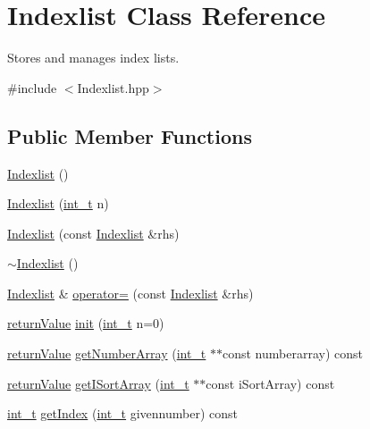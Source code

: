 \hypertarget{class_indexlist}{}\section{Indexlist Class Reference}
\label{class_indexlist}


Stores and manages index lists.  




{\ttfamily \#include $<$Indexlist.\+hpp$>$}

\subsection*{Public Member Functions}
\begin{DoxyCompactItemize}
\item 
\hyperlink{class_indexlist_ae8912418954f7d3988b45e61ae3e1792}{Indexlist} ()
\item 
\hyperlink{class_indexlist_aa8c9a7435650a1f0d6690fa14ff033dc}{Indexlist} (\hyperlink{_types_8hpp_ab6fd6105e64ed14a0c9281326f05e623}{int\+\_\+t} n)
\item 
\hyperlink{class_indexlist_ad9e5f23de8e6689e64bb47fa94d54af3}{Indexlist} (const \hyperlink{class_indexlist}{Indexlist} \&rhs)
\item 
\hyperlink{class_indexlist_a25da3346974b3749f54355fc040c6450}{$\sim$\+Indexlist} ()
\item 
\hyperlink{class_indexlist}{Indexlist} \& \hyperlink{class_indexlist_a3f2085c6aed278494e5314691d155a93}{operator=} (const \hyperlink{class_indexlist}{Indexlist} \&rhs)
\item 
\hyperlink{_message_handling_8hpp_a81d556f613bfbabd0b1f9488c0fa865e}{return\+Value} \hyperlink{class_indexlist_ab835188e0e58ae5fd081fbb16a9f859c}{init} (\hyperlink{_types_8hpp_ab6fd6105e64ed14a0c9281326f05e623}{int\+\_\+t} n=0)
\item 
\hyperlink{_message_handling_8hpp_a81d556f613bfbabd0b1f9488c0fa865e}{return\+Value} \hyperlink{class_indexlist_adbf88e12d610ba437fb4438d4a8af74f}{get\+Number\+Array} (\hyperlink{_types_8hpp_ab6fd6105e64ed14a0c9281326f05e623}{int\+\_\+t} $\ast$$\ast$const numberarray) const
\item 
\hyperlink{_message_handling_8hpp_a81d556f613bfbabd0b1f9488c0fa865e}{return\+Value} \hyperlink{class_indexlist_a406fb27db70906d4794df30616e281b6}{get\+I\+Sort\+Array} (\hyperlink{_types_8hpp_ab6fd6105e64ed14a0c9281326f05e623}{int\+\_\+t} $\ast$$\ast$const i\+Sort\+Array) const
\item 
\hyperlink{_types_8hpp_ab6fd6105e64ed14a0c9281326f05e623}{int\+\_\+t} \hyperlink{class_indexlist_a1534c1bd558955279083bd44ff9cfc91}{get\+Index} (\hyperlink{_types_8hpp_ab6fd6105e64ed14a0c9281326f05e623}{int\+\_\+t} givennumber) const

\end{DoxyCompactItemize}
